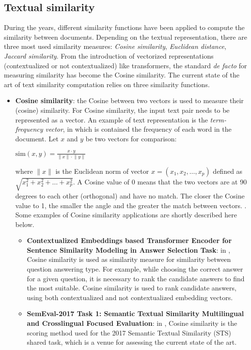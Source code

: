 \documentclass[\main/main.tex]{subfiles}
\begin{document}
\subsection{Textual similarity}
During the years, different similarity functions have been applied to compute the similarity between documents. Depending on the textual representation, there are three most used similarity measures: \emph{Cosine similarity}, \emph{Euclidean distance}, \emph{Jaccard similarity}. From the introduction of vectorized representations (contextualized or not contextualized) like transformers, the standard \emph{de facto} for measuring similarity has become the Cosine similarity.
The current state of the art of text similarity computation relies on three similarity functions.
\begin{itemize}
    \item \textbf{Cosine similarity}: the Cosine between two vectors is used to measure their (cosine) similarity. For Cosine similarity, the input text pair needs to be represented as a vector. An example of text representation is the \emph{term-frequency vector}, in which is contained the frequency of each word in the document. Let $x$ and $y$ be two vectors for comparison:
    \begin{center}
        $\mathrm{sim}(x, y) = \frac{x \cdot y}{\lVert x \rVert \cdot \lVert y \rVert}$
    \end{center}
    where $\lVert x \rVert$ is the Euclidean norm of vector $x = (x_1, x_2,\dots, x_p)$ defined as \\$\sqrt{x^2_1 + x^2_2 + \dots + x^2_p}$. A Cosine value of 0 means that the two vectors are at 90 degrees to each other (orthogonal) and have no match. The closer the Cosine value to 1, the smaller the angle and the greater the match between vectors. \cite{Cosine_HAN201239} \cite{Gomaa2013ASO}. Some examples of Cosine similarity applications are shortly described here below.
    \begin{itemize}
        \item \textbf{Contextualized Embeddings based Transformer Encoder for Sentence Similarity Modeling in Answer Selection Task}: in \cite{Laskar2020ContextualizedEB} , Cosine similarity is used as similarity measure for similarity between question answering type. For example, while choosing the correct answer for a given question, it is necessary to rank the candidate answers to find the most suitable. Cosine similarity is used to rank candidate answers, using both contextualized and not contextualized embedding vectors.
        \item \textbf{SemEval-2017 Task 1: Semantic Textual Similarity Multilingual and Crosslingual Focused Evaluation}: in \cite{Cer2017SemEval2017T1}, Cosine similarity is the scoring method used for the 2017 Semantic Textual Similarity (STS) shared task, which is a venue for assessing the current state of the art.

\end{itemize}
\end{itemize}
\end{document}
